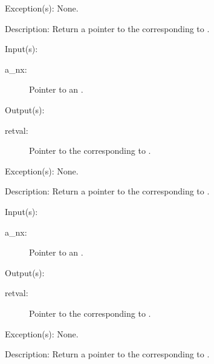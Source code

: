 \begin{capi}
\begin{capilist}
	\item[Exception(s): ] None.
	\item[Description: ]
		Return a pointer to the  corresponding to
		.
	\end{capilist}
\label{nx_globaldict_get}
	\begin{capilist}
	\item[Input(s): ]
		\begin{description}\item[]
		\item[a\_nx: ]
			Pointer to an .
		\end{description}
	\item[Output(s): ]
		\begin{description}\item[]
		\item[retval: ]
			Pointer to the  corresponding to
			.
		\end{description}
	\item[Exception(s): ] None.
	\item[Description: ]
		Return a pointer to the  corresponding to
		.
	\end{capilist}
\label{nx_stdin_get}
	\begin{capilist}
	\item[Input(s): ]
		\begin{description}\item[]
		\item[a\_nx: ]
			Pointer to an \classname{nx}.
		\end{description}
	\item[Output(s): ]
		\begin{description}\item[]
		\item[retval: ]
			Pointer to the  corresponding to
			\onyxop{stdin}{}.
		\end{description}
	\item[Exception(s): ] None.
	\item[Description: ]
		Return a pointer to the  corresponding to
		\onyxop{stdin}{}.
	\end{capilist}

\end{capi}
